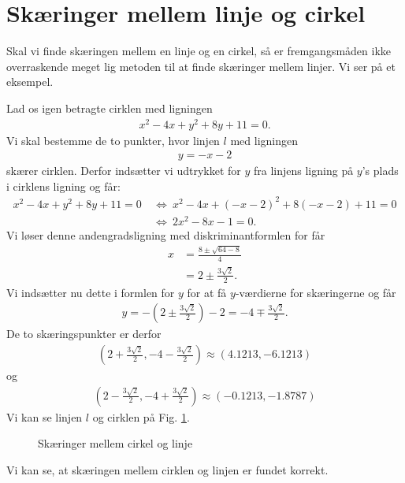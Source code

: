 \section*{Skæringer mellem linje og cirkel}
Skal vi finde skæringen mellem en linje og en cirkel, så er fremgangsmåden ikke overraskende meget lig metoden til at finde skæringer mellem linjer. Vi ser på et eksempel.
\begin{exa}
Lad os igen betragte cirklen med ligningen 
\begin{align*}
x^2-4x+y^2+8y+11 = 0.
\end{align*}
Vi skal bestemme de to punkter, hvor linjen $l$ med ligningen 
\begin{align*}
y = -x-2
\end{align*}
skærer cirklen. Derfor indsætter vi udtrykket for $y$ fra linjens ligning på $y$'s plads i cirklens ligning og får:
\begin{align*}
x^2-4x+y^2+8y+11 = 0 \  &\Leftrightarrow \  x^2-4x+(-x-2)^2+8(-x-2)+11=0\\
&\Leftrightarrow \ 2x^2-8x-1 = 0.
\end{align*}
Vi løser denne andengradsligning med diskriminantformlen for får
\begin{align*}
x &= \frac{8\pm\sqrt{64-8}}{4}\\
&= 2\pm \frac{3\sqrt{2}}{2}.
\end{align*}
Vi indsætter nu dette i formlen for $y$ for at få $y$-værdierne for skæringerne og får
\begin{align*}
y = -(2\pm \frac{3\sqrt{2}}{2}) - 2 = -4 \mp \frac{3\sqrt{2}}{2}.
\end{align*}
De to skæringspunkter er derfor
\begin{align*}
(2+ \frac{3\sqrt{2}}{2},-4 - \frac{3\sqrt{2}}{2}) \approx (4.1213,-6.1213)
\end{align*}
og
\begin{align*}
(2- \frac{3\sqrt{2}}{2},-4 + \frac{3\sqrt{2}}{2}) \approx (-0.1213,-1.8787)
\end{align*}
Vi kan se linjen $l$ og cirklen på Fig. \ref{fig:cirkel}.
\begin{figure}[H]
\centering
\resizebox{0.7\textwidth}{0.7\textwidth}
{
}
\caption{Skæringer mellem cirkel og linje}
\label{fig:cirkel}
\end{figure}
Vi kan se, at skæringen mellem cirklen og linjen er fundet korrekt.
\end{exa}

